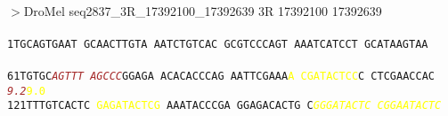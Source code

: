 \documentclass[11pt,twoside,reqno,a4paper]{article}
\begin{document}
\\
$>$DroMel	seq2837\_3R\_17392100\_17392639	3R	17392100	17392639 \\
 \\
\texttt{1\hspace*{3\charwidth}TGCAGTGAAT	GCAACTTGTA	AATCTGTCAC	GCGTCCCAGT	AAATCATCCT	GCATAAGTAA	\\
\hspace*{4\charwidth}\hspace*{1\charwidth}\hspace*{1\charwidth}\hspace*{1\charwidth}\hspace*{1\charwidth}\hspace*{1\charwidth}\hspace*{1\charwidth}\\
61\hspace*{2\charwidth}TGTGC\textit{\textcolor{brown}{A}}\textit{\textcolor{brown}{G}}\textit{\textcolor{brown}{T}}\textit{\textcolor{brown}{T}}\textit{\textcolor{brown}{T}}	\textit{\textcolor{brown}{A}}\textit{\textcolor{brown}{G}}\textit{\textcolor{brown}{C}}\textit{\textcolor{brown}{C}}\textit{\textcolor{brown}{C}}GGAGA	ACACACCCAG	AATTCGAAA\textcolor{yellow}{A}	\textcolor{yellow}{C}\textcolor{yellow}{G}\textcolor{yellow}{A}\textcolor{yellow}{T}\textcolor{yellow}{A}\textcolor{yellow}{C}\textcolor{yellow}{T}\textcolor{yellow}{C}\textcolor{yellow}{C}C	CTCGAACCAC	\\
\hspace*{4\charwidth}\hspace*{5\charwidth}\textit{\textcolor{brown}{9.2}}\hspace*{1\charwidth}\hspace*{1\charwidth}\hspace*{1\charwidth}\hspace*{31\charwidth}\textcolor{yellow}{9.0}\hspace*{1\charwidth}\hspace*{1\charwidth}\hspace*{1\charwidth}\\
121\hspace*{1\charwidth}TTTGTCACTC	\textcolor{yellow}{G}\textcolor{yellow}{A}\textcolor{yellow}{G}\textcolor{yellow}{A}\textcolor{yellow}{T}\textcolor{yellow}{A}\textcolor{yellow}{C}\textcolor{yellow}{T}\textcolor{yellow}{C}\textcolor{yellow}{G}	AAATACCCGA	GGAGACACTG	C\textit{\textcolor{yellow}{G}}\textit{\textcolor{yellow}{G}}\textit{\textcolor{yellow}{G}}\textit{\textcolor{yellow}{A}}\textit{\textcolor{yellow}{T}}\textit{\textcolor{yellow}{A}}\textit{\textcolor{yellow}{C}}\textit{\textcolor{yellow}{T}}\textit{\textcolor{yellow}{C}}	\textit{\textcolor{yellow}{C}}\textit{\textcolor{yellow}{G}}\textit{\textcolor{yellow}{G}}\textit{\textcolor{yellow}{A}}\textit{\textcolor{yellow}{A}}\textit{\textcolor{yellow}{T}}\textit{\textcolor{yellow}{A}}\textit{\textcolor{yellow}{C}}\textit{\textcolor{yellow}{T}}\textit{\textcolor{yellow}{C}}	\\
}
\end{document}
